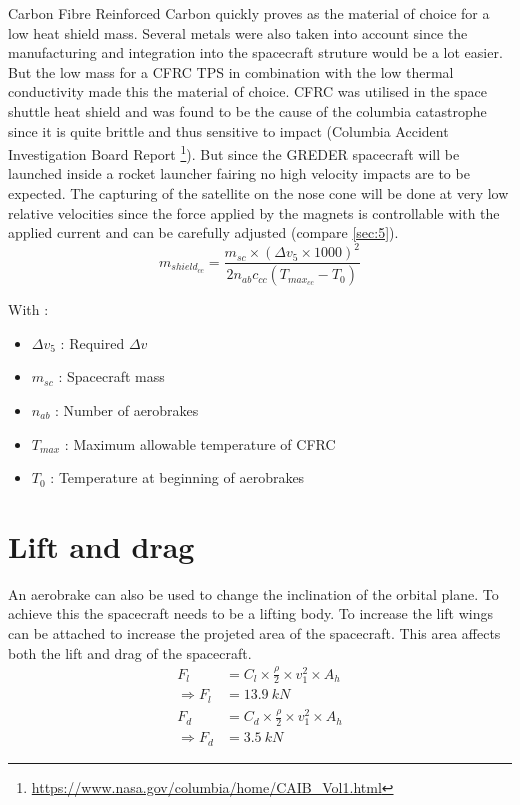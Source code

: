 Carbon Fibre Reinforced Carbon quickly proves as the material of choice for a low heat shield mass. Several metals were also taken into account since the manufacturing and integration into the spacecraft struture would be a lot easier. But the low mass for a CFRC TPS in combination with the low thermal conductivity made this the material of choice. CFRC was utilised in the space shuttle heat shield and was found to be the cause of the columbia catastrophe since it is quite brittle and thus sensitive to impact (Columbia Accident Investigation Board Report \footnote{\url{https://www.nasa.gov/columbia/home/CAIB\_Vol1.html}}). But since the GREDER spacecraft will be launched inside a rocket launcher fairing no high velocity impacts are to be expected. The capturing of the satellite on the nose cone will be done at very low relative velocities since the force applied by the magnets is controllable with the applied current and can be carefully adjusted (compare \autoref{sec:5}).
\begin{equation}
	m_{shield_{cc}}= \frac{m_{sc} \times (\Delta v_5\times 1000)^2}{2n_{ab}c_{cc}(T_{max_{cc}}-T_0)}
\end{equation}

With :
\begin{itemize}
	\itemsep0em 
	\item $\Delta v_5$ : Required $\Delta v$
	\item $m_{sc}$ : Spacecraft mass
	\item $n_{ab}$ : Number of aerobrakes
	\item $T_{max}$ : Maximum allowable temperature of CFRC
	\item $T_0$ : Temperature at beginning of aerobrakes
\end{itemize}

\section{Lift and drag}

\qquad An aerobrake can also be used to change the inclination of the orbital plane. To achieve this the spacecraft needs to be a lifting body. To increase the lift wings can be attached to increase the projeted area of the spacecraft. This area affects both the lift and drag of the spacecraft.
\begin{align}
	F_l &= C_l\times\frac \rho 2 \times v_1^2 \times A_h\\
	\Rightarrow F_l &= 13.9\ kN\\
	F_d &= C_d\times\frac \rho 2 \times v_1^2 \times A_h\\
	\Rightarrow F_d &= 3.5\ kN
\end{align}

